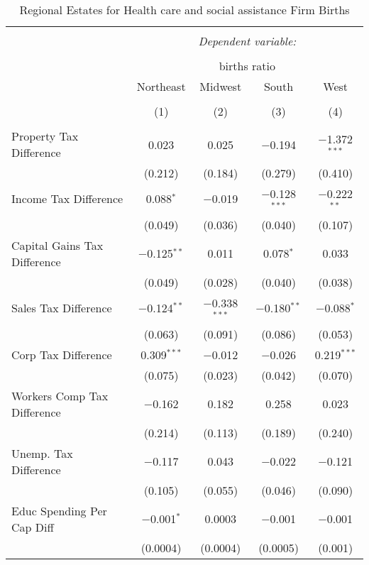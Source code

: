 
\begin{table}[!htbp] \centering 
  \caption{Regional Estates for  Health care and social assistance Firm Births} 
  \label{} 
\begin{tabular}{@{\extracolsep{5pt}}lcccc} 
\\[-1.8ex]\hline 
\hline \\[-1.8ex] 
 & \multicolumn{4}{c}{\textit{Dependent variable:}} \\ 
\cline{2-5} 
\\[-1.8ex] & \multicolumn{4}{c}{births ratio} \\ 
 & Northeast & Midwest & South & West \\ 
\\[-1.8ex] & (1) & (2) & (3) & (4)\\ 
\hline \\[-1.8ex] 
 Property Tax Difference & 0.023 & 0.025 & $-$0.194 & $-$1.372$^{***}$ \\ 
  & (0.212) & (0.184) & (0.279) & (0.410) \\ 
  Income Tax Difference & 0.088$^{*}$ & $-$0.019 & $-$0.128$^{***}$ & $-$0.222$^{**}$ \\ 
  & (0.049) & (0.036) & (0.040) & (0.107) \\ 
  Capital Gains Tax Difference & $-$0.125$^{**}$ & 0.011 & 0.078$^{*}$ & 0.033 \\ 
  & (0.049) & (0.028) & (0.040) & (0.038) \\ 
  Sales Tax Difference & $-$0.124$^{**}$ & $-$0.338$^{***}$ & $-$0.180$^{**}$ & $-$0.088$^{*}$ \\ 
  & (0.063) & (0.091) & (0.086) & (0.053) \\ 
  Corp Tax Difference & 0.309$^{***}$ & $-$0.012 & $-$0.026 & 0.219$^{***}$ \\ 
  & (0.075) & (0.023) & (0.042) & (0.070) \\ 
  Workers Comp Tax Difference & $-$0.162 & 0.182 & 0.258 & 0.023 \\ 
  & (0.214) & (0.113) & (0.189) & (0.240) \\ 
  Unemp. Tax Difference & $-$0.117 & 0.043 & $-$0.022 & $-$0.121 \\ 
  & (0.105) & (0.055) & (0.046) & (0.090) \\ 
  Educ Spending Per Cap Diff & $-$0.001$^{*}$ & 0.0003 & $-$0.001 & $-$0.001 \\ 
  & (0.0004) & (0.0004) & (0.0005) & (0.001) \\ 

\end{tabular}
\end{table}
